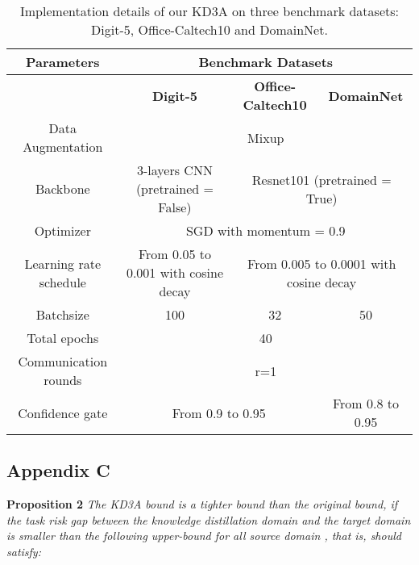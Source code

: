 \documentclass{article}
\begin{document}
\begin{table*}[htbp]
\centering
\begin{tabular}{c|c|c|c}
Parameters             & \multicolumn{3}{c}{Benchmark Datasets}                                                            \\ \hline
                       & \textbf{Digit-5}                              & \textbf{Office-Caltech10}              & \textbf{DomainNet}                   \\ \hline
Data Augmentation      & \multicolumn{3}{c}{Mixup }                                                          \\ \hline
Backbone               & 3-layers CNN (pretrained = False)    & \multicolumn{2}{c}{Resnet101 (pretrained = True)}          \\ \hline
Optimizer              & \multicolumn{3}{c}{SGD with momentum = 0.9}                                                       \\ \hline
Learning rate schedule & From 0.05 to 0.001 with cosine decay & \multicolumn{2}{c}{From 0.005 to 0.0001 with cosine decay} \\ \hline
Batchsize              & 100                                  & 32                            & 50                          \\ \hline
Total epochs           & \multicolumn{3}{c}{40}                                                                            \\ \hline
Communication rounds   & \multicolumn{3}{c}{r=1}                                                                           \\ \hline
Confidence gate        & \multicolumn{2}{c|}{From 0.9 to 0.95}                                & From 0.8 to 0.95            \\ \hline
\end{tabular}
\caption{Implementation details of our KD3A on three benchmark datasets: Digit-5, Office-Caltech10 and DomainNet.}
\label{table:implement}
\end{table*}
\subsection{Appendix C}
\textbf{Proposition 2} \textit{The KD3A bound is a tighter bound than the original bound, if the task risk gap between the knowledge distillation domain  and the target domain  is smaller than the following upper-bound for all source domain , that is,  should satisfy:}
\end{document}
